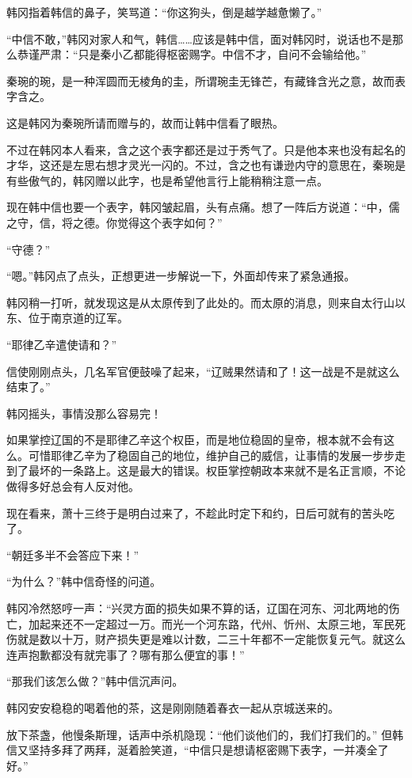 韩冈指着韩信的鼻子，笑骂道：“你这狗头，倒是越学越惫懒了。”

“中信不敢，”韩冈对家人和气，韩信……应该是韩中信，面对韩冈时，说话也不是那么恭谨严肃：“只是秦小乙都能得枢密赐字。中信不才，自问不会输给他。”

秦琬的琬，是一种浑圆而无棱角的圭，所谓琬圭无锋芒，有藏锋含光之意，故而表字含之。

这是韩冈为秦琬所请而赠与的，故而让韩中信看了眼热。

不过在韩冈本人看来，含之这个表字都还是过于秀气了。只是他本来也没有起名的才华，这还是左思右想才灵光一闪的。不过，含之也有谦逊内守的意思在，秦琬是有些傲气的，韩冈赠以此字，也是希望他言行上能稍稍注意一点。

现在韩中信也要一个表字，韩冈皱起眉，头有点痛。想了一阵后方说道：“中，儒之守，信，将之德。你觉得这个表字如何？”

“守德？”

“嗯。”韩冈点了点头，正想更进一步解说一下，外面却传来了紧急通报。

韩冈稍一打听，就发现这是从太原传到了此处的。而太原的消息，则来自太行山以东、位于南京道的辽军。

“耶律乙辛遣使请和？”

信使刚刚点头，几名军官便鼓噪了起来，“辽贼果然请和了！这一战是不是就这么结束了。”

韩冈摇头，事情没那么容易完！

如果掌控辽国的不是耶律乙辛这个权臣，而是地位稳固的皇帝，根本就不会有这么。可惜耶律乙辛为了稳固自己的地位，维护自己的威信，让事情的发展一步步走到了最坏的一条路上。这是最大的错误。权臣掌控朝政本来就不是名正言顺，不论做得多好总会有人反对他。

现在看来，萧十三终于是明白过来了，不趁此时定下和约，日后可就有的苦头吃了。

“朝廷多半不会答应下来！”

“为什么？”韩中信奇怪的问道。

韩冈冷然怒哼一声：“兴灵方面的损失如果不算的话，辽国在河东、河北两地的伤亡，加起来还不一定超过一万。而光一个河东路，代州、忻州、太原三地，军民死伤就是数以十万，财产损失更是难以计数，二三十年都不一定能恢复元气。就这么连声抱歉都没有就完事了？哪有那么便宜的事！”

“那我们该怎么做？”韩中信沉声问。

韩冈安安稳稳的喝着他的茶，这是刚刚随着春衣一起从京城送来的。

放下茶盏，他慢条斯理，话声中杀机隐现：“他们谈他们的，我们打我们的。”
但韩信又坚持多拜了两拜，涎着脸笑道，“中信只是想请枢密赐下表字，一并凑全了好。”
